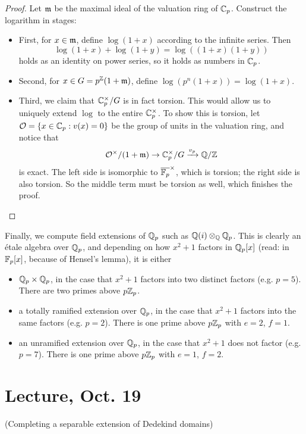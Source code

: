 \documentclass[11pt]{amsart}
\begin{document}
\begin{proof}
Let $\mathfrak{m}$ be the maximal ideal of the valuation ring of $\mathbb{C}_p$. Construct the logarithm in stages:
\begin{itemize}
    \item First, for $x\in \mathfrak{m}$, define $\log(1+x)$ according to the infinite series. Then 
    \[\log(1+x) + \log(1+y) = \log((1+x)(1+y))\]
    holds as an identity on power series, so it holds as numbers in $\mathbb{C}_p$.
    \item Second, for $x\in G = p^{\mathbb{Z}}(1+\mathfrak{m})$, define $\log(p^n(1+x)) = \log(1+x)$.
    \item Third, we claim that $\mathbb{C}_p^{\times}/G$ is in fact torsion. This would allow us to uniquely extend $\log$ to the entire $\mathbb{C}_p^{\times}$. To show this is torsion, let $\mathcal{O} = \{x\in\mathbb{C}_p: v(x) = 0\}$ be the group of units in the valuation ring, and notice that
    \[\mathcal{O}^{\times}/(1+\mathfrak{m}) \to \mathbb{C}_p^{\times}/G \xrightarrow{v_p} \mathbb{Q}/\mathbb{Z} \]
    is exact. The left side is isomorphic to $\overline{\mathbb{F}_p}^{\times}$, which is torsion; the right side is also torsion. So the middle term must be torsion as well, which finishes the proof.
\end{itemize}
\end{proof}

Finally, we compute field extensions of $\mathbb{Q}_p$ such as $\mathbb{Q}(i)\otimes_{\mathbb{Q}} \mathbb{Q}_p$. This is clearly an \'etale algebra over $\mathbb{Q}_p$, and depending on how $x^2+1$ factors in $\mathbb{Q}_p[x]$ (read: in $\mathbb{F}_p[x]$, because of Hensel's lemma), it is either
\begin{itemize}
    \item $\mathbb{Q}_p\times \mathbb{Q}_p$, in the case that $x^2+1$ factors into two distinct factors (e.g. $p=5$). There are two primes above $p\mathbb{Z}_p$.
    \item a totally ramified extension over $\mathbb{Q}_p$, in the case that $x^2+1$ factors into the same factors (e.g. $p=2$). There is one prime above $p\mathbb{Z}_p$ with $e=2$, $f=1$.
    \item an unramified extension over $\mathbb{Q}_p$, in the case that $x^2+1$ does not factor (e.g. $p=7$). There is one prime above $p\mathbb{Z}_p$ with $e=1$, $f=2$.
\end{itemize}


\section{Lecture, Oct. 19}

(Completing a separable extension of Dedekind domains)
\end{document}

